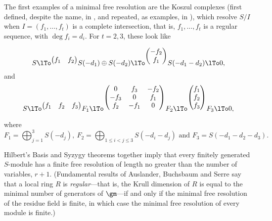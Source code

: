 The first examples of a minimal free resolution are the Koszul complexes
(first defined, despite the name, in \cite{Cayley}, and repeated, as examples, 
in \cite{Hilbert1890}), which resolve $S/I$ when
 $I = (f_1,\dots, f_t)$
is a complete intersection, that is, $f_1,\dots, f_t$ is a regular sequence, with $\deg f_i = d_i$.  For $t = 2,3$, these look like

$$
S
\lTo^{ \begin{pmatrix}
f_1&f_2
\end{pmatrix}} 
S(-d_1)\oplus S(-d_2) 
\lTo^{\begin{pmatrix}
-f_2\\f_1
\end{pmatrix}}
 S(-d_1-d_2)\lTo 0,
$$
and
$$
S
\lTo^{
 \begin{pmatrix}
f_1&f_2&f_3
\end{pmatrix}} 
F_1\lTo^{
\begin{pmatrix}
 0&f_3&-f_2\\
 -f_3&0&f_1\\
 f_2&-f_1&0
\end{pmatrix}}
F_2
\lTo^{\begin{pmatrix}
f_1\\f_2\\f_3
\end{pmatrix}}
 F_3 \lTo 0,
$$

where
$$
F_1 = \bigoplus_{j=1}^3S(-d_j),\
 F_2=
\bigoplus_{1\leq i <j\leq 3} S(-d_i-d_j) \text{ and }
F_3 = 
S(-d_1-d_2-d_3).
$$

%

Hilbert's Basis and Syzygy theorems together imply that every finitely generated $S$-module has a finite free resolution
of length no greater than the number of variables, $r+1$. (Fundamental
results of Auslander, Buchsbaum and Serre say that a local ring $R$ is \emph{regular}---that is, the Krull dimension of $R$ is equal to the minimal number
of generators of $\gm$---if and only if the minimal free resolution of the residue field is finite, in which case
the minimal free resolution of every module is finite.)

